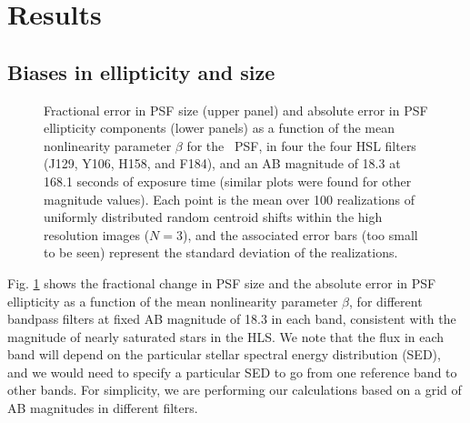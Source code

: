 \documentclass[11pt,preprint,flushrt]{aastex}
\begin{document}
\section{Results}
\label{results}
\subsection{Biases in ellipticity and size}

\begin{figure}[!h]
\centering
{}
\caption{Fractional error in PSF size (upper panel) and absolute error in PSF ellipticity components (lower panels) as a function of the mean nonlinearity parameter $\beta$ for the \wfa\ PSF, in four the four HSL filters (J129, Y106, H158, and F184), and an AB magnitude of 18.3 at 168.1 seconds of exposure time (similar plots were found for other magnitude values). Each point is the mean over 100 realizations of uniformly distributed random centroid shifts within the high resolution images ($N=3$), and the associated error bars (too small to be seen) represent the standard deviation of the realizations.}
\label{f2}
\end{figure}

Fig. \ref{f2} shows the fractional change in PSF size and the absolute error in PSF ellipticity as a function of the mean nonlinearity parameter $\beta$, for different bandpass filters at fixed AB magnitude of 18.3 in each band, consistent with the magnitude of nearly saturated stars in the HLS. We note that the flux in each band will depend on the particular stellar spectral energy distribution (SED), and we would need to specify a particular SED to go from one reference band to other bands. For simplicity, we are performing our calculations based on a grid of AB magnitudes in different filters. 
\end{document}

